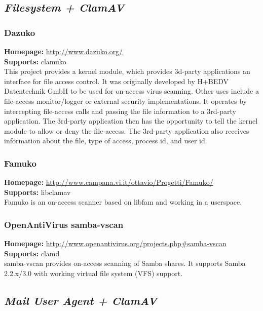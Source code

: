 \documentclass[a4paper,titlepage,12pt]{article}
\begin{document}
    \subsection{\emph{Filesystem + ClamAV}}

    \subsubsection{Dazuko}
    \textbf{Homepage:} \url{http://www.dazuko.org/}\\
    \textbf{Supports:} clamuko\\[4pt]
    This project provides a kernel module, which provides 3d-party applications
    an interface for file access control. It was originally developed by H+BEDV
    Datentechnik GmbH to be used for on-access virus scanning. Other uses
    include a file-access monitor/logger or external security implementations.
    It operates by intercepting file-access calls and passing the file
    information to a 3rd-party application. The 3rd-party application then has
    the opportunity to tell the kernel module to allow or deny the file-access.
    The 3rd-party application also receives information about the file, type
    of access, process id, and user id.

    \subsubsection{Famuko}
    \textbf{Homepage:} \url{http://www.campana.vi.it/ottavio/Progetti/Famuko/}\\
    \textbf{Supports:} libclamav\\[4pt]
    Famuko is an on-access scanner based on libfam and working in a userspace.

    \subsubsection{OpenAntiVirus samba-vscan}\label{samba-vscan}
    \textbf{Homepage:} \url{http://www.openantivirus.org/projects.php#samba-vscan}\\
    \textbf{Supports:} clamd\\[4pt]
    samba-vscan provides on-access scanning of Samba shares. It supports
    Samba 2.2.x/3.0 with working virtual file system (VFS) support. 

    \subsection{\emph{Mail User Agent + ClamAV}}
\end{document}
